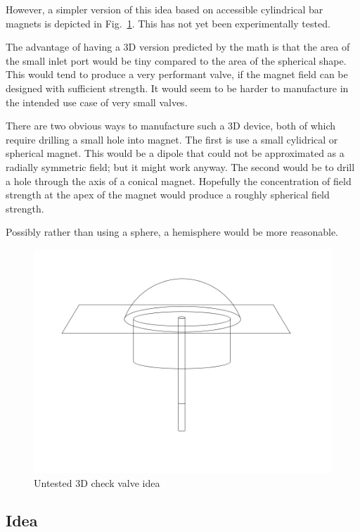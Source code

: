 \documentclass{asme2ej}
\begin{document}
However, a simpler version of this idea based on accessible
cylindrical bar magnets is depicted in Fig.~\ref{fig:3dcheckvalve}.
This has not yet been experimentally tested.

The advantage of having a 3D version predicted by the math is that the area
of the small inlet port would be tiny compared to the area of the spherical
shape. This would tend to produce a very performant valve, if the magnet
field can be designed with sufficient strength. It would seem to be harder
to manufacture in the intended use case of very small valves.

There are two obvious ways to manufacture such a 3D device, both of which require
drilling a small hole into magnet. The first is use a small cylidrical or spherical
magnet. This would be a dipole that could not be approximated as a radially
symmetric field; but it might work anyway.  The second would be to drill a hole
through the axis of a conical magnet. Hopefully the concentration of field strength
at the apex of the magnet would produce a roughly spherical field strength.

Possibly rather than using a sphere, a hemisphere would be more reasonable.

\begin{figure}
\centerline{\includegraphics[width=6in]{figure/3DCheckValve.png}}
\caption{Untested 3D check valve idea}
\label{fig:3dcheckvalve}
\end{figure}

\subsection{Idea}
\end{document}
